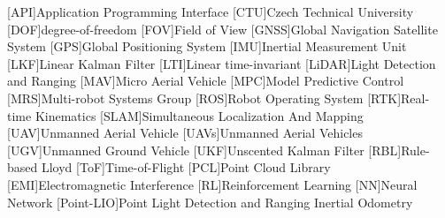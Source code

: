 
\begin{acronym}
  [API]{Application Programming Interface}
  [CTU]{Czech Technical University}
  [DOF]{degree-of-freedom}
  [FOV]{Field of View}
  [GNSS]{Global Navigation Satellite System}
  [GPS]{Global Positioning System}
  [IMU]{Inertial Measurement Unit}
  [LKF]{Linear Kalman Filter}
  [LTI]{Linear time-invariant}
  [LiDAR]{Light Detection and Ranging}
  [MAV]{Micro Aerial Vehicle}
  [MPC]{Model Predictive Control}
  [MRS]{Multi-robot Systems Group}
  [ROS]{Robot Operating System}
  [RTK]{Real-time Kinematics}
  [SLAM]{Simultaneous Localization And Mapping}
  [UAV]{Unmanned Aerial Vehicle}
  [UAVs]{Unmanned Aerial Vehicles}
  [UGV]{Unmanned Ground Vehicle}
  [UKF]{Unscented Kalman Filter}
  [RBL]{Rule-based Lloyd}
  [ToF]{Time-of-Flight}
  [PCL]{Point Cloud Library}
  [EMI]{Electromagnetic Interference}
  [RL]{Reinforcement Learning}
  [NN]{Neural Network}
  [Point-LIO]{Point Light Detection and Ranging Inertial Odometry}
\end{acronym}
